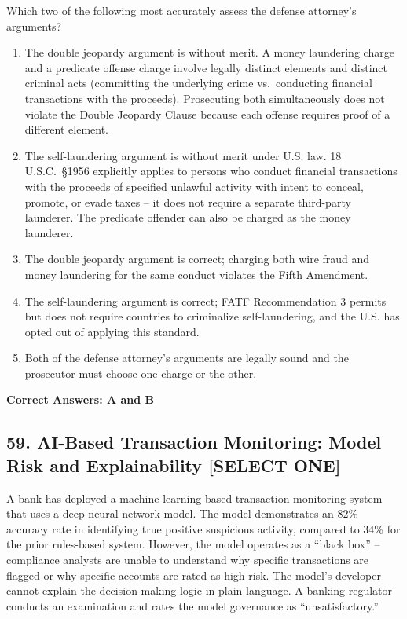 \documentclass[11pt,a4paper]{article}
\begin{document}
	Which two of the following most accurately assess the defense attorney's arguments?
	
	\begin{enumerate}[label=\Alph*.]
		\item The double jeopardy argument is without merit. A money laundering charge and a predicate offense charge involve legally distinct elements and distinct criminal acts (committing the underlying crime vs.\ conducting financial transactions with the proceeds). Prosecuting both simultaneously does not violate the Double Jeopardy Clause because each offense requires proof of a different element.
		\item The self-laundering argument is without merit under U.S. law. 18 U.S.C.\ \S 1956 explicitly applies to persons who conduct financial transactions with the proceeds of specified unlawful activity with intent to conceal, promote, or evade taxes -- it does not require a separate third-party launderer. The predicate offender can also be charged as the money launderer.
		\item The double jeopardy argument is correct; charging both wire fraud and money laundering for the same conduct violates the Fifth Amendment.
		\item The self-laundering argument is correct; FATF Recommendation 3 permits but does not require countries to criminalize self-laundering, and the U.S. has opted out of applying this standard.
		\item Both of the defense attorney's arguments are legally sound and the prosecutor must choose one charge or the other.
	\end{enumerate}
	\textbf{Correct Answers: A and B}
	
	\subsection{59. AI-Based Transaction Monitoring: Model Risk and Explainability \textnormal{[SELECT ONE]}}
	
	A bank has deployed a machine learning-based transaction monitoring system that uses a deep neural network model. The model demonstrates an 82\% accuracy rate in identifying true positive suspicious activity, compared to 34\% for the prior rules-based system. However, the model operates as a ``black box'' -- compliance analysts are unable to understand why specific transactions are flagged or why specific accounts are rated as high-risk. The model's developer cannot explain the decision-making logic in plain language. A banking regulator conducts an examination and rates the model governance as ``unsatisfactory.''
	
\end{document}
